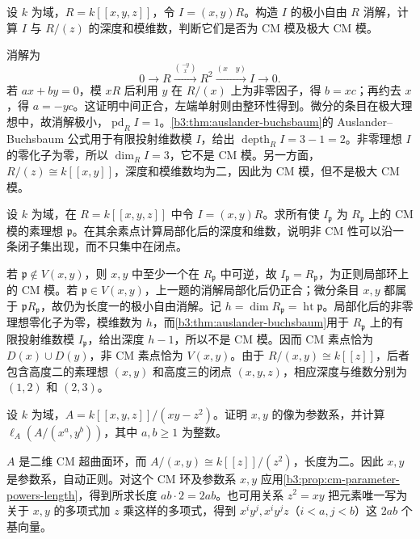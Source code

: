 \begin{exercise}\label{b3:ex:19-maximal-cm-module}
	设 \(k\) 为域，\(R=k[\![x,y,z]\!]\)，令 \(I=(x,y)R\)。构造 \(I\) 的极小自由 \(R\) 消解，计算 \(I\) 与 \(R/(z)\) 的深度和模维数，判断它们是否为 CM 模及极大 CM 模。
\end{exercise}
\begin{solution}
	消解为
	\[
		0\longrightarrow R\xrightarrow{\binom{-y}{x}}R^2 \xrightarrow{(x\quad y)}I\longrightarrow0.
	\]
	若 \(ax+by=0\)，模 \(xR\) 后利用 \(y\) 在 \(R/(x)\) 上为非零因子，得 \(b=xc\)；再约去 \(x\)，得 \(a=-yc\)。这证明中间正合，左端单射则由整环性得到。微分的条目在极大理想中，故消解极小，\(\operatorname{pd}_RI=1\)。\cref{b3:thm:auslander-buchsbaum}的 Auslander–Buchsbaum 公式用于有限投射维数模 \(I\)，给出 \(\operatorname{depth}_RI=3-1=2\)。非零理想 \(I\) 的零化子为零，所以 \(\dim_RI=3\)，它不是 CM 模。另一方面，\(R/(z)\cong k[\![x,y]\!]\)，深度和模维数均为二，因此为 CM 模，但不是极大 CM 模。
\end{solution}

\begin{exercise}\label{b3:ex:19-local-cm-failure}
	设 \(k\) 为域，在 \(R=k[\![x,y,z]\!]\) 中令 \(I=(x,y)R\)。求所有使 \(I_{\mathfrak p}\) 为 \(R_{\mathfrak p}\) 上的 CM 模的素理想 \(\mathfrak p\)。在其余素点计算局部化后的深度和维数，说明非 CM 性可以沿一条闭子集出现，而不只集中在闭点。
\end{exercise}
\begin{solution}
	若 \(\mathfrak p\notin V(x,y)\)，则 \(x,y\) 中至少一个在 \(R_{\mathfrak p}\) 中可逆，故 \(I_{\mathfrak p}=R_{\mathfrak p}\)，为正则局部环上的 CM 模。若 \(\mathfrak p\in V(x,y)\)，上一题的消解局部化后仍正合；微分条目 \(x,y\) 都属于 \(\mathfrak pR_{\mathfrak p}\)，故仍为长度一的极小自由消解。记 \(h=\dim R_{\mathfrak p}=\operatorname{ht}\mathfrak p\)。局部化后的非零理想零化子为零，模维数为 \(h\)，而\cref{b3:thm:auslander-buchsbaum}用于 \(R_{\mathfrak p}\) 上的有限投射维数模 \(I_{\mathfrak p}\)，给出深度 \(h-1\)，所以不是 CM 模。因而 CM 素点恰为 \(D(x)\cup D(y)\)，非 CM 素点恰为 \(V(x,y)\)。由于 \(R/(x,y)\cong k[\![z]\!]\)，后者包含高度二的素理想 \((x,y)\) 和高度三的闭点 \((x,y,z)\)，相应深度与维数分别为 \((1,2)\) 和 \((2,3)\)。
\end{solution}

\begin{exercise}\label{b3:ex:19-quadric-parameters}
	设 \(k\) 为域，\(A=k[\![x,y,z]\!]/(xy-z^2)\)。证明 \(x,y\) 的像为参数系，并计算 \(\ell_A(A/(x^a,y^b))\)，其中 \(a,b\ge1\) 为整数。
\end{exercise}
\begin{solution}
	\(A\) 是二维 CM 超曲面环，而 \(A/(x,y)\cong k[\![z]\!]/(z^2)\)，长度为二。因此 \(x,y\) 是参数系，自动正则。对这个 CM 环及参数系 \(x,y\) 应用\cref{b3:prop:cm-parameter-powers-length}，得到所求长度 \(ab\cdot2=2ab\)。也可用关系 \(z^2=xy\) 把元素唯一写为关于 \(x,y\) 的多项式加 \(z\) 乘这样的多项式，得到 \(x^iy^j,x^iy^jz\)（\(i<a,j<b\)）这 \(2ab\) 个基向量。
\end{solution}

